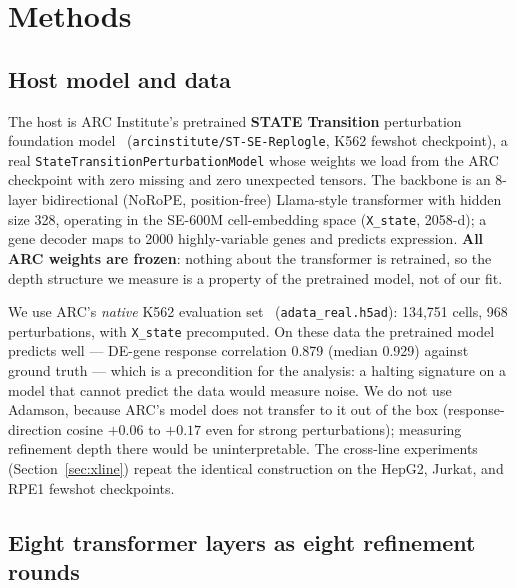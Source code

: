 \documentclass[11pt]{article}
\begin{document}
\section{Methods}
\label{sec:methods}

\subsection{Host model and data}

The host is ARC Institute's pretrained \textbf{STATE Transition} perturbation foundation model~\cite{state2025}
(\texttt{arcinstitute/ST-SE-Replogle}, K562 fewshot checkpoint), a real
\texttt{StateTransitionPerturbationModel} whose weights we load from the ARC checkpoint with zero
missing and zero unexpected tensors. The backbone is an 8-layer bidirectional (NoRoPE, position-free)
Llama-style transformer with hidden size 328, operating in the SE-600M cell-embedding space
(\texttt{X\_state}, 2058-d); a gene decoder maps to 2000 highly-variable genes and predicts
expression. \textbf{All ARC weights are frozen}: nothing about the transformer is retrained, so
the depth structure we measure is a property of the pretrained model, not of our fit.

We use ARC's \emph{native} K562 evaluation set~\cite{replogle2022} (\texttt{adata\_real.h5ad}): 134{,}751 cells, 968
perturbations, with \texttt{X\_state} precomputed. On these data the pretrained model predicts
well --- DE-gene response correlation 0.879 (median 0.929) against ground truth --- which is a
precondition for the analysis: a halting signature on a model that cannot predict the data would
measure noise. We do not use Adamson, because ARC's model does not transfer to it out of the box
(response-direction cosine $+0.06$ to $+0.17$ even for strong perturbations); measuring refinement
depth there would be uninterpretable. The cross-line experiments (Section~\ref{sec:xline}) repeat
the identical construction on the HepG2, Jurkat, and RPE1 fewshot checkpoints.

\subsection{Eight transformer layers as eight refinement rounds}
\label{sec:refinerounds}
\end{document}

